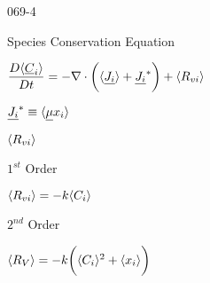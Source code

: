 \begin{mitframe}{069-4}
\begin{listone}
\begin{listtwo}
\begin{listthree}
		\end{listthree}

	\end{listtwo}

\item Species Conservation Equation

	\begin{listtwo}
                                     
		\item $\dfrac{\elecdisplace\langle\uline{\conc}_{\state}\rangle}{\elecdisplace{t}}=-\nabla\cdot\bigg(\langle\uline{\molspecflux}\rangle+\uline{\molspecflux}^*\bigg)+\langle\gasconst_{\vvel\state}\rangle$
                    
		\begin{listthree}               
			
            \item $\uline{\molspecflux}^*\equiv\langle\uline{\chempot}\specfrac{i}\rangle$
			\item $\langle\gasconst_{\vvel\state}\rangle$
                    
 			\begin{listfour}
				
                \item $1^{st}$ Order
				
                \begin{listfive}
				
                \item $\langle\gasconst_{\vvel\state}\rangle=-\thermcond\langle\conc_{\state}\rangle$
                
                \end{listfive}
                
                \item $2^{nd}$ Order
				
                \begin{listfive}
					
                    \item $\langle\specsource\rangle=-\thermcond\bigg(\langle\conc_{\state}\rangle^2+\langle\specfrac{i}\rangle\bigg)$
                                                
				\end{listfive}
                
			\end{listfour}
		
        \end{listthree}
            
	\end{listtwo}

\end{listone}

\end{mitframe}